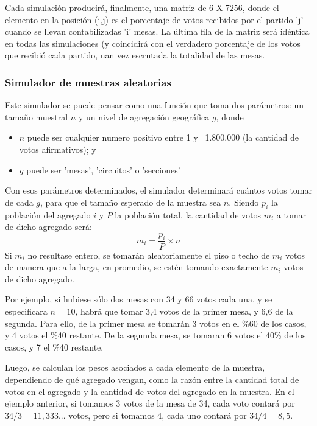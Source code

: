 \documentclass[12pt, a4paper]{article}
\begin{document}
Cada simulaci\'on producir\'a, finalmente, una matriz de 6 X 7256, donde el elemento en la posici\'on (i,j) es el porcentaje de votos recibidos por el partido 'j' cuando se llevan contabilizadas 'i' mesas. La \'ultima fila de la matriz ser\'a id\'entica en todas las simulaciones (y coincidir\'a con el verdadero porcentaje de los votos que recibi\'o cada partido, uan vez escrutada la totalidad de las mesas.

\subsubsection{Simulador de muestras aleatorias}

Este simulador se puede pensar como una funci\'on que toma dos par\'ametros: un tama\~no muestral $n$ y un nivel de agregaci\'on geogr\'afica $g$, donde 

\begin{itemize}
	\item $n$ puede ser cualquier numero positivo entre 1 y ~1.800.000 (la cantidad de votos afirmativos); y
	\item $g$ puede ser 'mesas', 'circuitos' o 'secciones'
\end{itemize}

Con esos par\'ametros determinados, el simulador determinar\'a cu\'antos votos tomar de cada $g$, para que el tama\~no esperado de la muestra sea $n$. Siendo $p_{i}$ la poblaci\'on del agregado $i$ y $P$ la poblaci\'on total, la cantidad de votos $m_{i}$ a tomar de dicho agregado ser\'a:
$$ m_{i} = \frac{p_{i}}{P} \times{} n $$
	Si $m_{i}$ no resultase entero, se tomar\'an aleatoriamente el piso o techo de $m_{i}$ votos de manera que a la larga, en promedio, se est\'en tomando exactamente $m_{i}$ votos de dicho agregado.

Por ejemplo, si hubiese s\'olo dos mesas con 34 y 66 votos cada una, y se especificara $n=10$, habr\'a que tomar 3,4 votos de la primer mesa, y 6,6 de la segunda. Para ello, de la primer mesa se tomar\'an 3 votos en el \%60 de los casos, y 4 votos el \%40 restante. De la segunda mesa, se tomaran 6 votos el 40\% de los casos, y 7 el \%40 restante.

Luego, se calculan los pesos asociados a cada elemento de la muestra, dependiendo de qu\'e agregado vengan, como la raz\'on entre la cantidad total de votos en el agregado y la cantidad de votos del agregado en la muestra. En el ejemplo anterior, si tomamos 3 votos de la mesa de 34, cada voto contar\'a por $34/3 = 11,333...$ votos, pero si tomamos 4, cada uno contar\'a por $34/4 = 8,5$.
\end{document}
